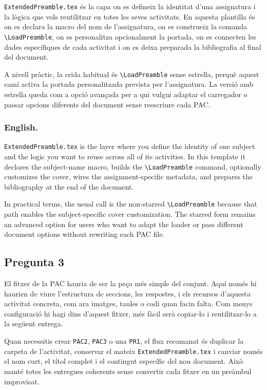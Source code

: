 			\texttt{ExtendedPreamble.tex} és la capa on es defineix la identitat d'una assignatura i la lògica que vols reutilitzar en totes les seves activitats. En aquesta plantilla és on es declara la macro del nom de l'assignatura, on es construeix la comanda \verb|\LoadPreamble|, on es personalitza opcionalment la portada, on es connecten les dades específiques de cada activitat i on es deixa preparada la bibliografia al final del document.

			A nivell pràctic, la crida habitual és \verb|\LoadPreamble| sense estrella, perquè aquest camí activa la portada personalitzada prevista per l'assignatura. La versió amb estrella queda com a opció avançada per a qui vulgui adaptar el carregador o passar opcions diferents del document sense reescriure cada PAC.

		\subsubsection*{English.}
		\texttt{ExtendedPreamble.tex} is the layer where you define the identity of one subject and the logic you want to reuse across all of its activities. In this template it declares the subject-name macro, builds the \verb|\LoadPreamble| command, optionally customizes the cover, wires the assignment-specific metadata, and prepares the bibliography at the end of the document.

		In practical terms, the usual call is the non-starred \verb|\LoadPreamble| because that path enables the subject-specific cover customization. The starred form remains an advanced option for users who want to adapt the loader or pass different document options without rewriting each PAC file.

	\subsection{Pregunta 3}

			El fitxer de la PAC hauria de ser la peça més simple del conjunt. Aquí només hi haurien de viure l'estructura de seccions, les respostes, i els recursos d'aquesta activitat concreta, com ara imatges, taules o codi quan facin falta. Com menys configuració hi hagi dins d'aquest fitxer, més fàcil serà copiar-lo i reutilitzar-lo a la següent entrega.

			Quan necessitis crear \texttt{PAC2}, \texttt{PAC3} o una \texttt{PR1}, el flux recomanat és duplicar la carpeta de l'activitat, conservar el mateix \texttt{ExtendedPreamble.tex} i canviar només el nom curt, el títol complet i el contingut específic del nou document. Això manté totes les entregues coherents sense convertir cada fitxer en un preàmbul improvisat.

